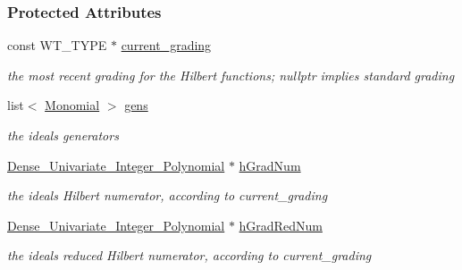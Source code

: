 \subsubsection*{Protected Attributes}
\begin{DoxyCompactItemize}
\item 
\mbox{\label{group__polygroup_a5363a11d0bdbc878e3bdc201e620518e}} 
const W\+T\+\_\+\+T\+Y\+PE $\ast$ \hyperlink{group__polygroup_a5363a11d0bdbc878e3bdc201e620518e}{current\+\_\+grading}
\begin{DoxyCompactList}\small\item\em the most recent grading for the Hilbert functions; {\ttfamily nullptr} implies standard grading \end{DoxyCompactList}\item 
\mbox{\label{group__polygroup_a201c8da1d540749b19af0b4dea1dbe86}} 
list$<$ \hyperlink{group__polygroup_class_monomial}{Monomial} $>$ \hyperlink{group__polygroup_a201c8da1d540749b19af0b4dea1dbe86}{gens}
\begin{DoxyCompactList}\small\item\em the ideal\textquotesingle{}s generators \end{DoxyCompactList}\item 
\mbox{\label{group__polygroup_a958dee87e6d37079b72c095b79ff0347}} 
\hyperlink{group__polygroup_class_dense___univariate___integer___polynomial}{Dense\+\_\+\+Univariate\+\_\+\+Integer\+\_\+\+Polynomial} $\ast$ \hyperlink{group__polygroup_a958dee87e6d37079b72c095b79ff0347}{h\+Grad\+Num}
\begin{DoxyCompactList}\small\item\em the ideal\textquotesingle{}s Hilbert numerator, according to current\+\_\+grading \end{DoxyCompactList}\item 
\mbox{\label{group__polygroup_a383828c3e1596abe05b6184d45cd7f7a}} 
\hyperlink{group__polygroup_class_dense___univariate___integer___polynomial}{Dense\+\_\+\+Univariate\+\_\+\+Integer\+\_\+\+Polynomial} $\ast$ \hyperlink{group__polygroup_a383828c3e1596abe05b6184d45cd7f7a}{h\+Grad\+Red\+Num}
\begin{DoxyCompactList}\small\item\em the ideal\textquotesingle{}s reduced Hilbert numerator, according to current\+\_\+grading \end{DoxyCompactList}\item 

\end{DoxyCompactItemize}
